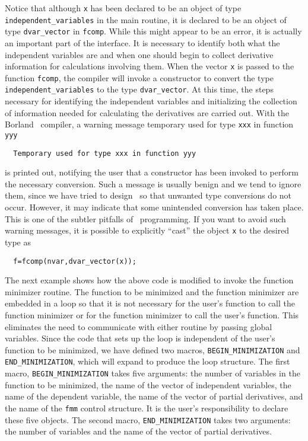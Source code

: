 \documentclass{admbmanual}
\begin{document}
Notice that although \texttt{x} has been declared to be an object of type
\texttt{independent\_variables} in the main routine, it is declared to be an
object of type \texttt{dvar\_vector} in \texttt{fcomp}. While this might appear
to be an error, it is actually an important part of the interface. It is
necessary to identify both what the independent variables are and when one
should begin to collect derivative information for calculations involving them.
When the vector \texttt{x} is passed to the function \texttt{fcomp}, the
compiler will invoke a constructor to convert the type
\texttt{independent\_variables} to the type \texttt{dvar\_vector}. At this time,
the steps necessary for identifying the independent variables and initializing
the collection of information needed for calculating the derivatives are carried
out. With the Borland \cplus\ compiler, a warning message
%
{temporary used for type \texttt{xxx} in function \texttt{yyy}}
\begin{lstlisting}
  Temporary used for type xxx in function yyy
\end{lstlisting}
\noindent is printed out, notifying the user that a constructor has been invoked
to perform the necessary conversion. Such a message is usually benign and we
tend to ignore them, since we have tried to design \scAD\ so that unwanted type
conversions do not occur. However, it may indicate that some unintended
conversion has taken place. This is one of the subtler pitfalls of \cplus\
programming. If you want to avoid such warning messages, it is possible to
explicitly ``cast'' the object \texttt{x} to the desired type as
\begin{lstlisting}
  f=fcomp(nvar,dvar_vector(x));
\end{lstlisting}

The next example shows how the above code is modified to invoke the function
minimizer routine. The function to be minimized and the function minimizer are
embedded in a loop so that it is not necessary for the user's function to call
the function minimizer or for the function minimizer to call the user's
function. This eliminates the need to communicate with either routine by passing
global variables. Since the code that sets up the loop is independent of the
user's function to be minimized, we have defined two macros,
\texttt{BEGIN\_MINIMIZATION} and \texttt{END\_MINIMIZATION}, which will expand
to produce the loop structure. The first macro, \texttt{BEGIN\_MINIMIZATION}
takes five arguments: the number of variables in the function to be minimized,
the name of the vector of independent variables, the name of the dependent
variable, the name of the vector of partial derivatives, and the name of the
\texttt{fmm} control structure. It is the user's responsibility to declare these
five objects. The second macro, \texttt{END\_MINIMIZATION} takes two arguments:
the number of variables and the name of the vector of partial derivatives.

\end{document}
